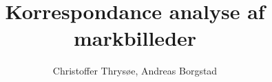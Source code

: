 \documentclass[11pt,a4paper,oldfontcommands,twosided,article]{memoir}
\title{Korrespondance analyse af markbilleder}
\author{Christoffer Thrysøe, Andreas Borgstad}
\date{} %
\begin{document}
\maketitle %
\newpage
\renewcommand{\contentsname}{Indholdsfortegnelse}
\setcounter{secnumdepth}{3}
\setcounter{tocdepth}{1}
\tableofcontents*
\newpage
{}

\newpage

\newpage

\newpage

\newpage%

\newpage

\newpage

\newpage

\nocite{}

\newpage
\appendix
\def\@chapapp{Appendix}

\end{document}
